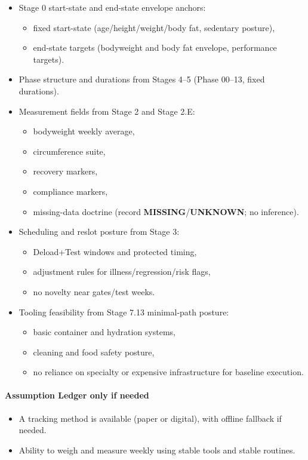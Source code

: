 \documentclass[10pt]{article}
\begin{document}
\begin{itemize}
\item Stage 0 start-state and end-state envelope anchors:
  \begin{itemize}
  \item fixed start-state (age/height/weight/body fat, sedentary posture),
  \item end-state targets (bodyweight and body fat envelope, performance targets).
  \end{itemize}
\item Phase structure and durations from Stages 4–5 (Phase 00–13, fixed durations).
\item Measurement fields from Stage 2 and Stage 2.E:
  \begin{itemize}
  \item bodyweight weekly average,
  \item circumference suite,
  \item recovery markers,
  \item compliance markers,
  \item missing-data doctrine (record \textbf{MISSING}/\textbf{UNKNOWN}; no inference).
  \end{itemize}
\item Scheduling and reslot posture from Stage 3:
  \begin{itemize}
  \item Deload+Test windows and protected timing,
  \item adjustment rules for illness/regression/risk flags,
  \item no novelty near gates/test weeks.
  \end{itemize}
\item Tooling feasibility from Stage 7.13 minimal-path posture:
  \begin{itemize}
  \item basic container and hydration systems,
  \item cleaning and food safety posture,
  \item no reliance on specialty or expensive infrastructure for baseline execution.
  \end{itemize}
\end{itemize}

\paragraph*{Assumption Ledger only if needed}

\begin{itemize}
\item A tracking method is available (paper or digital), with offline fallback if needed.
\item Ability to weigh and measure weekly using stable tools and stable routines.
\end{itemize}
\end{document}
